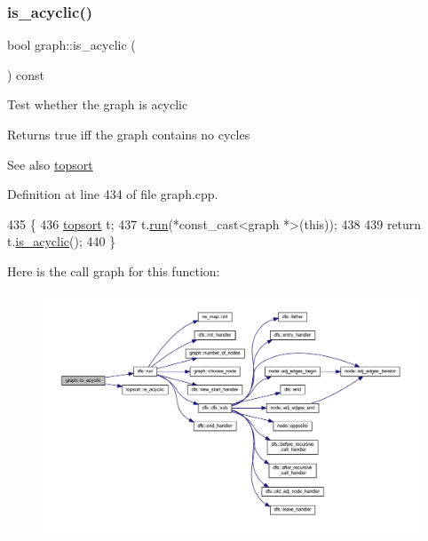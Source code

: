\subsubsection{\texorpdfstring{is\+\_\+acyclic()}{is\_acyclic()}}
{\footnotesize\ttfamily bool graph\+::is\+\_\+acyclic (\begin{DoxyParamCaption}{ }\end{DoxyParamCaption}) const}

Test whether the graph is acyclic

\begin{DoxyReturn}{Returns}
true iff the graph contains no cycles 
\end{DoxyReturn}
\begin{DoxySeeAlso}{See also}
\mbox{\hyperlink{classtopsort}{topsort}} 
\end{DoxySeeAlso}


Definition at line 434 of file graph.\+cpp.


\begin{DoxyCode}
435 \{
436     \mbox{\hyperlink{classtopsort}{topsort}} t;
437     t.\mbox{\hyperlink{classdfs_af0863b8974d5fd58cd0375c78ed8163b}{run}}(*const\_cast<graph *>(\textcolor{keyword}{this}));
438 
439     \textcolor{keywordflow}{return} t.\mbox{\hyperlink{classtopsort_a05a4cb00bbd60859f4939355b23c25f1}{is\_acyclic}}();
440 \}
\end{DoxyCode}
Here is the call graph for this function\+:
\nopagebreak
\begin{figure}[H]
\begin{center}
\leavevmode
\includegraphics[width=350pt]{classgraph_a9b500cb72826fe5bbefa8c71bc4642fa_cgraph}
\end{center}
\end{figure}
\mbox{\label{classgraph_a8014a8073dd640c91cbd4fc1fb6e6071}} 
